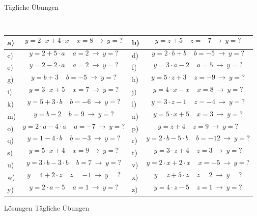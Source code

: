 \documentclass[12pt]{article}
\begin{document}
\centerline{{\Large Tägliche Übungen}} 
\vspace{1cm}
\noindent \\


\begin{xltabular}{\textwidth}{|C{0.75cm}|X|C{0.75cm}|X|}
\hline
a)&$$y=2 \cdot x + 4 \cdot x~~~~~ x=8 ~ \rightarrow ~ y=?$$
&
b)&$$y=z + 5~~~~~ z=-7 ~ \rightarrow ~ y=?$$
\\\hline
c)&$$y=2 + 5 \cdot a~~~~~ a=2 ~ \rightarrow ~ y=?$$
&
d)&$$y=2 \cdot b + b~~~~~ b=-5 ~ \rightarrow ~ y=?$$
\\\hline
e)&$$y=2 - 2 \cdot a~~~~~ a=2 ~ \rightarrow ~ y=?$$
&
f)&$$y=3 \cdot a - 2~~~~~ a=5 ~ \rightarrow ~ y=?$$
\\\hline
g)&$$y=b + 3~~~~~ b=-5 ~ \rightarrow ~ y=?$$
&
h)&$$y=5 \cdot z + 3~~~~~ z=-9 ~ \rightarrow ~ y=?$$
\\\hline
i)&$$y=3 \cdot x + 5~~~~~ x=7 ~ \rightarrow ~ y=?$$
&
j)&$$y=4 \cdot x - x~~~~~ x=8 ~ \rightarrow ~ y=?$$
\\\hline
k)&$$y=5 + 3 \cdot b~~~~~ b=-6 ~ \rightarrow ~ y=?$$
&
l)&$$y=3 \cdot z - 1~~~~~ z=-4 ~ \rightarrow ~ y=?$$
\\\hline
m)&$$y=b - 2~~~~~ b=9 ~ \rightarrow ~ y=?$$
&
n)&$$y=5 \cdot x + 5~~~~~ x=3 ~ \rightarrow ~ y=?$$
\\\hline
o)&$$y=2 \cdot a - 4 \cdot a~~~~~ a=-7 ~ \rightarrow ~ y=?$$
&
p)&$$y=z + 4~~~~~ z=9 ~ \rightarrow ~ y=?$$
\\\hline
q)&$$y=1 - 4 \cdot b~~~~~ b=-3 ~ \rightarrow ~ y=?$$
&
r)&$$y=2 \cdot b - 5 \cdot b~~~~~ b=-12 ~ \rightarrow ~ y=?$$
\\\hline
s)&$$y=5 \cdot x + 4~~~~~ x=9 ~ \rightarrow ~ y=?$$
&
t)&$$y=3 \cdot z + 4~~~~~ z=3 ~ \rightarrow ~ y=?$$
\\\hline
u)&$$y=3 \cdot b - 3 \cdot b~~~~~ b=7 ~ \rightarrow ~ y=?$$
&
v)&$$y=2 \cdot x + 2 \cdot x~~~~~ x=-5 ~ \rightarrow ~ y=?$$
\\\hline
w)&$$y=4 + 2 \cdot z~~~~~ z=-1 ~ \rightarrow ~ y=?$$
&
x)&$$y=z + 5 \cdot z~~~~~ z=2 ~ \rightarrow ~ y=?$$
\\\hline
y)&$$y=2 \cdot a - 5~~~~~ a=1 ~ \rightarrow ~ y=?$$
&
z)&$$y=4 \cdot z - 5~~~~~ z=1 ~ \rightarrow ~ y=?$$
\\\hline
\end{xltabular}
\vspace{0.5cm}
\newpage
{}
\centerline{{\large Lösungen Tägliche Übungen}} 
\vspace{0.5cm}
\end{document}
